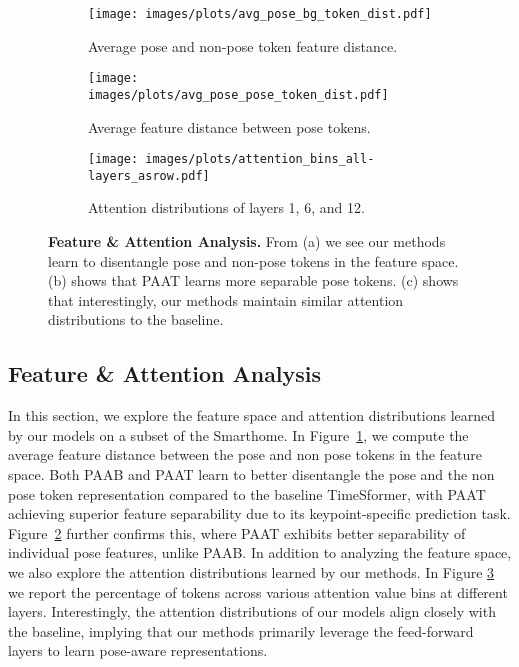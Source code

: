 \documentclass{article}
\begin{document}
\begin{figure}
    \centering
    \begin{subfigure}{0.48\textwidth}
        \texttt{[image: images/plots/avg\_pose\_bg\_token\_dist.pdf]}
        \caption{Average pose and non-pose token feature distance.}
        \label{fig:avg_dist_pose_bg}
    \end{subfigure}
    \begin{subfigure}{0.48\textwidth}
        \texttt{[image: images/plots/avg\_pose\_pose\_token\_dist.pdf]}
        \caption{Average feature distance between pose tokens.}
        \label{fig:avg_dist_pose_pose}
    \end{subfigure}
    \hfill
    \begin{subfigure}{\textwidth}        
        \texttt{[image: images/plots/attention\_bins\_all-layers\_asrow.pdf]}
        \caption{Attention distributions of layers 1, 6, and 12.}
        \label{fig:attention_distributions}
    \end{subfigure}
    \label{fig:model_diagnostics}  \vspace{-0.2in}
    \caption{\textbf{Feature \& Attention Analysis.} From (a) we see our methods learn to disentangle pose and non-pose tokens in the feature space. (b) shows that PAAT learns more separable pose tokens. (c) shows that interestingly, our methods maintain similar attention distributions to the baseline.} \vspace{-0.2in}
\end{figure}


\subsection{Feature \& Attention Analysis}\label{sec:model_diagnostics}
In this section, we explore the feature space and attention distributions learned by our models on a subset of the Smarthome. In Figure~\ref{fig:avg_dist_pose_bg}, we compute the average feature distance between the pose and non pose tokens in the feature space. Both PAAB and PAAT learn to better disentangle the pose and the non pose token representation compared to the baseline TimeSformer, with PAAT achieving superior feature separability due to its keypoint-specific prediction task. Figure~\ref{fig:avg_dist_pose_pose} further confirms this, where PAAT exhibits better separability of individual pose features, unlike PAAB. 
In addition to analyzing the feature space, we also explore the attention distributions learned by our methods. In Figure \ref{fig:attention_distributions} we report the percentage of tokens across various attention value bins at different layers. Interestingly, the attention distributions of our models align closely with the baseline, implying that our methods primarily leverage the feed-forward layers to learn pose-aware representations.
\end{document}
